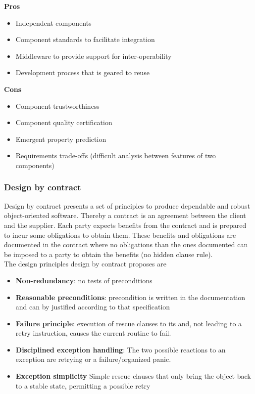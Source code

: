 \begin{minipage}[t]{0.49\textwidth}
    \textbf{Pros}
    \begin{itemize}[topsep=0pt, itemsep=0pt]
        \item Independent components
        \item Component standards to facilitate integration
        \item Middleware to provide support for inter-operability
        \item Development process that is geared to reuse
    \end{itemize}
\end{minipage}
\begin{minipage}[t]{0.49\textwidth}
    \textbf{Cons}
    \begin{itemize}[topsep=0pt, itemsep=0pt]
        \item Component trustworthiness
        \item Component quality certification
        \item Emergent property prediction
        \item Requirements trade-offs (difficult analysis between features of two components)
    \end{itemize}
\end{minipage}

\subsubsection{Design by contract}
Design by contract presents a set of principles to produce dependable and robust object-oriented software.
Thereby a contract is an agreement between the client and the supplier.
Each party expects benefits from the contract and is prepared to incur some obligations to obtain them.
These benefits and obligations are documented in the contract where no obligations than the ones documented can be imposed to a party to obtain the benefits (no hidden clause rule).\\
The design principles design by contract proposes are
\begin{itemize}
  \item \textbf{Non-redundancy}: no tests of preconditions
  \item \textbf{Reasonable preconditions}: precondition is written in the documentation and can by justified according to that specification
  \item \textbf{Failure principle}: execution of rescue clauses to its and, not leading to a retry instruction, causes the current routine to fail.
  \item \textbf{Disciplined exception handling}: The two possible reactions to an exception are retrying or a failure/organized panic.
  \item \textbf{Exception simplicity} Simple rescue clauses that only bring the object back to a stable state, permitting a possible retry
\end{itemize}

